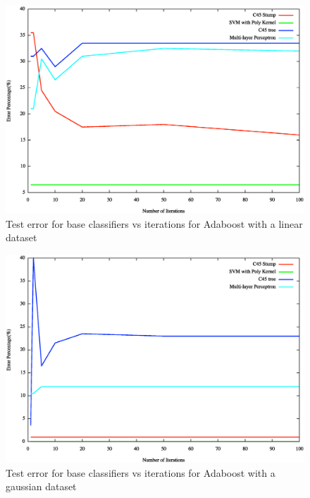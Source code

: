 \documentclass[letterpaper,11pt]{article}
\begin{document}
\begin{figure}[H]
  \centering
  \includegraphics[width=140mm]{modelVsAccuracy-test-linear.eps}
  \caption{Test error for base classifiers vs iterations for Adaboost with a linear dataset}
  \label{fig:modelVsAccuracytestlinear}
\end{figure}

\begin{figure}[H]
  \centering
  \includegraphics[width=140mm]{modelVsAccuracy-test-gaussian.eps}
  \caption{Test error for base classifiers vs iterations for Adaboost with a gaussian dataset}
  \label{fig:modelVsAccuracytestgaussian}
\end{figure}
\end{document}
